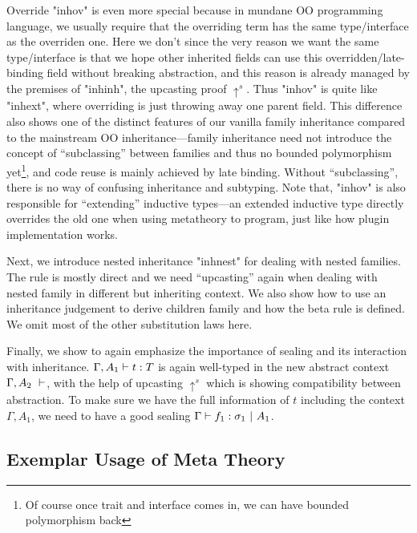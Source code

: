 Override "inhov" is even more special because in mundane OO programming
language, we usually require that the overriding term has the same
type/interface as the overriden one.  Here we don't since the very
reason we want the same type/interface is that we hope other inherited
fields can use this overridden/late-binding field without breaking
abstraction, and this reason is already managed by the premises of
"inhinh", the upcasting proof $\uparrow^s$. Thus "inhov" is quite like
"inhext", where overriding is just throwing away one parent field. This
difference also shows one of the distinct features of our vanilla family
inheritance compared to the mainstream OO inheritance---family
inheritance need not introduce the concept of ``subclassing''
between families and thus no bounded polymorphism yet\footnote{Of course
once trait and interface comes in, we can have bounded polymorphism
back}, and code reuse is mainly achieved by late binding. Without
``subclassing'', there is no way of confusing inheritance and subtyping.
Note that, "inhov" is also responsible for ``extending'' inductive
types---an extended inductive type directly overrides the old one when
using metatheory to program, just like how plugin implementation works.

Next, we introduce nested inheritance "inhnest" for dealing with nested families. The rule is mostly direct and we need ``upcasting'' again when dealing with nested family in different but inheriting context.  We also show how to use an inheritance judgement to derive children family and how the beta rule is defined. We omit most of the other substitution laws here.

Finally, we show  to again emphasize the importance of sealing and its interaction with inheritance. ${ {\Gamma, A_1} \vdash {t} : {T} }$ is again well-typed in the new abstract context ${ {\Gamma, A_2} \ \vdash }$, with the help of upcasting $\uparrow^s$ which is showing compatibility between abstraction. To make sure we have the full information of $t$ including the context $\Gamma, A_1$, we need to have a good sealing ${ {\Gamma} \vdash {f_1} : {\sigma_1} \ |\ {A_1} }$.



\subsection{Exemplar Usage of Meta Theory}
